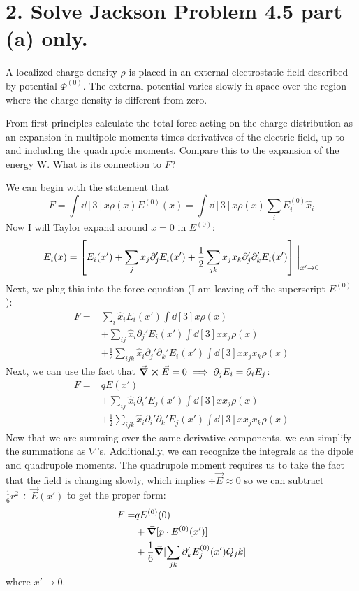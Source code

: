 \documentclass[a4paper,twoside]{article}
\begin{document}
\section*{2. Solve Jackson Problem 4.5 part (a) only.}
A localized charge density $\rho$ is placed in an external electrostatic field described by potential $ \Phi^{(0)} $. The external potential varies slowly in space over the region where the charge density is different from zero.

From first principles calculate the total force acting on the charge distribution as an expansion in multipole moments times derivatives of the electric field, up to and including the quadrupole moments. Compare this to the expansion of the energy W. What is its connection to $ F $?
\begin{tcolorbox}[breakable]
    We can begin with the statement that
    \begin{equation}
        F = \int \dd[3]{x} \rho(x) E^{(0)}(x) = \int \dd[3]{x} \rho(x) \sum_{i} E_i^{(0)} \hat{x}_i
    \end{equation}
    Now I will Taylor expand around $ x = 0 $ in $ E^{(0)} $:
    \begin{equation}
        E_i(x) = \left[ E_i (x') + \sum_j x_j\partial_j' E_i(x') + \frac{1}{2} \sum_{jk} x_j x_k\partial_j'\partial_k' E_i(x') \right]\eval_{x'\to 0}
    \end{equation}
    Next, we plug this into the force equation (I am leaving off the superscript $ E^{(0)} $):
    \begin{align}
        F =& \sum_i \hat{x}_i E_i(x') \int \dd[3]{x} \rho(x)\\
        &+ \sum_{ij} \hat{x}_i \partial_j' E_i(x') \int \dd[3]{x} x_j \rho(x)\\
        &+ \frac{1}{2} \sum_{ijk} \hat{x}_i \partial_j'\partial_k' E_i(x') \int \dd[3]{x} x_j x_k \rho(x)
    \end{align}
    Next, we can use the fact that $ \curl{ \vec{E}} = 0 \implies \partial_j E_i = \partial_i E_j $:
    \begin{align}
        F =& qE(x')\\
        &+ \sum_{ij} \hat{x}_i \partial_i' E_j(x') \int \dd[3]{x} x_j \rho(x)\\
        &+ \frac{1}{2} \sum_{ijk} \hat{x}_i \partial_i'\partial_k' E_j(x') \int \dd[3]{x} x_j x_k \rho(x)
    \end{align}
    Now that we are summing over the same derivative components, we can simplify the summations as $ \nabla $'s. Additionally, we can recognize the integrals as the dipole and quadrupole moments. The quadrupole moment requires us to take the fact that the field is changing slowly, which implies $ \div{ \vec{E}} \approx 0 $ so we can subtract $ \frac{1}{6} r^2 \div{ \vec{E} (x')} $ to get the proper form:
    \begin{align}
        F =& qE^{(0)}(0)\\
        &+ \grad{[p \cdot E^{(0)}(x')]}\\
        &+ \frac{1}{6} \grad{[\sum_{jk}\partial_k' E_j^{(0)}(x')Q_jk]}
    \end{align}
    where $ x' \to 0 $.


\end{tcolorbox}
\end{document}
